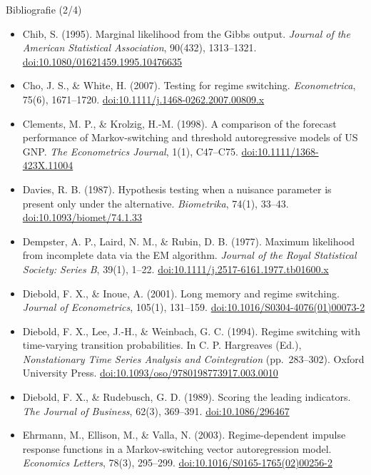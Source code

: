 \begin{frame}{Bibliografie (2/4)}
\itemsize{\tiny}
\begin{itemize}
    \item Chib, S. (1995). Marginal likelihood from the Gibbs output. \textit{Journal of the American Statistical Association}, 90(432), 1313--1321. \href{https://doi.org/10.1080/01621459.1995.10476635}{doi:10.1080/01621459.1995.10476635}
    \item Cho, J. S., \& White, H. (2007). Testing for regime switching. \textit{Econometrica}, 75(6), 1671--1720. \href{https://doi.org/10.1111/j.1468-0262.2007.00809.x}{doi:10.1111/j.1468-0262.2007.00809.x}
    \item Clements, M. P., \& Krolzig, H.-M. (1998). A comparison of the forecast performance of Markov-switching and threshold autoregressive models of US GNP. \textit{The Econometrics Journal}, 1(1), C47--C75. \href{https://doi.org/10.1111/1368-423X.11004}{doi:10.1111/1368-423X.11004}
    \item Davies, R. B. (1987). Hypothesis testing when a nuisance parameter is present only under the alternative. \textit{Biometrika}, 74(1), 33--43. \href{https://doi.org/10.1093/biomet/74.1.33}{doi:10.1093/biomet/74.1.33}
    \item Dempster, A. P., Laird, N. M., \& Rubin, D. B. (1977). Maximum likelihood from incomplete data via the EM algorithm. \textit{Journal of the Royal Statistical Society: Series B}, 39(1), 1--22. \href{https://doi.org/10.1111/j.2517-6161.1977.tb01600.x}{doi:10.1111/j.2517-6161.1977.tb01600.x}
    \item Diebold, F. X., \& Inoue, A. (2001). Long memory and regime switching. \textit{Journal of Econometrics}, 105(1), 131--159. \href{https://doi.org/10.1016/S0304-4076(01)00073-2}{doi:10.1016/S0304-4076(01)00073-2}
    \item Diebold, F. X., Lee, J.-H., \& Weinbach, G. C. (1994). Regime switching with time-varying transition probabilities. In C. P. Hargreaves (Ed.), \textit{Nonstationary Time Series Analysis and Cointegration} (pp.\ 283--302). Oxford University Press. \href{https://doi.org/10.1093/oso/9780198773917.003.0010}{doi:10.1093/oso/9780198773917.003.0010}
    \item Diebold, F. X., \& Rudebusch, G. D. (1989). Scoring the leading indicators. \textit{The Journal of Business}, 62(3), 369--391. \href{https://doi.org/10.1086/296467}{doi:10.1086/296467}
    \item Ehrmann, M., Ellison, M., \& Valla, N. (2003). Regime-dependent impulse response functions in a Markov-switching vector autoregression model. \textit{Economics Letters}, 78(3), 295--299. \href{https://doi.org/10.1016/S0165-1765(02)00256-2}{doi:10.1016/S0165-1765(02)00256-2}

\end{itemize}
\end{frame}
